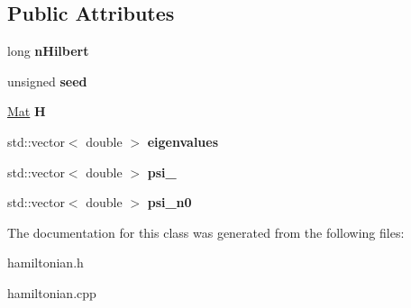 \subsection*{Public Attributes}
\begin{DoxyCompactItemize}
\item 
long {\bfseries n\+Hilbert}\hypertarget{classhamil_a8f3ba91f36a6ef7cef1c2248668a9ba4}{}\label{classhamil_a8f3ba91f36a6ef7cef1c2248668a9ba4}

\item 
unsigned {\bfseries seed}\hypertarget{classhamil_ad69ef2d8298340ce7c49617f5ffc1b46}{}\label{classhamil_ad69ef2d8298340ce7c49617f5ffc1b46}

\item 
\hyperlink{classMat}{Mat} {\bfseries H}\hypertarget{classhamil_aa440fff2dff9ec215fe5d50976deceae}{}\label{classhamil_aa440fff2dff9ec215fe5d50976deceae}

\item 
std\+::vector$<$ double $>$ {\bfseries eigenvalues}\hypertarget{classhamil_a22699c0dd6f460537289842e445d878e}{}\label{classhamil_a22699c0dd6f460537289842e445d878e}

\item 
std\+::vector$<$ double $>$ {\bfseries psi\+\_}\hypertarget{classhamil_a7626c19b1aebcf74f47a6ea77825d464}{}\label{classhamil_a7626c19b1aebcf74f47a6ea77825d464}

\item 
std\+::vector$<$ double $>$ {\bfseries psi\+\_\+n0}\hypertarget{classhamil_ab301c39efac3bcbd0fa5df20be44643c}{}\label{classhamil_ab301c39efac3bcbd0fa5df20be44643c}

\end{DoxyCompactItemize}


The documentation for this class was generated from the following files\+:\begin{DoxyCompactItemize}
\item 
hamiltonian.\+h\item 
hamiltonian.\+cpp\end{DoxyCompactItemize}
